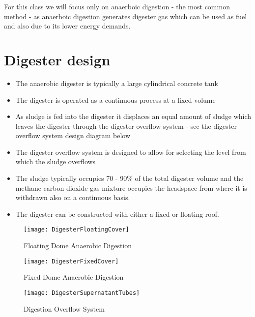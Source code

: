         For this class we will focus only on anaerboic digestion - the most common method - as anaerboic digestion generates digester gas which can be used as fuel and also due to its lower energy demands.
        \vspace{3mm}
\section{Digester design}
            
            \begin{itemize}
                \item The anaerobic digester is typically a large cylindrical concrete tank
                \item The digester is operated as a continuous process at a fixed volume
                \item As sludge is fed into the digester it displaces an equal amount of sludge which leaves the digester through the digester overflow system - see the digester overflow system design diagram below
                \item The digester overflow system is designed to allow for selecting the level from which the sludge overflows
                \item The sludge typically occupies 70 - 90\% of the total digester volume and the methane carbon dioxide gas mixture occupies the headspace from where it is withdrawn also on a continuous basis.
                \item The digester can be constructed with either a fixed or floating roof.
            \end{itemize}

\begin{figure}[H]
	\begin{center}
		\texttt{[image: DigesterFloatingCover]}\\
			\caption{Floating Dome Anaerobic Digestion}
	\end{center}
	\end{figure}
	
	
\begin{figure}[H]
	\begin{center}
		\texttt{[image: DigesterFixedCover]}\\
			\caption{Fixed Dome Anaerobic Digestion}
	\end{center}
	\end{figure}
	
	
\begin{figure}[H]
	\begin{center}
		\texttt{[image: DigesterSupernatantTubes]}\\
			\caption{Digestion Overflow System}
	\end{center}
	\end{figure}


